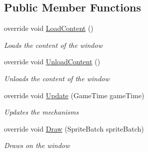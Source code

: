 \subsection*{Public Member Functions}
\begin{DoxyCompactItemize}
\item 
override void \hyperlink{class_hel_project_1_1_u_i_1_1_play_screen_af3639840bdd8de714d262377c417ee20}{Load\+Content} ()
\begin{DoxyCompactList}\small\item\em Loads the content of the window \end{DoxyCompactList}\item 
override void \hyperlink{class_hel_project_1_1_u_i_1_1_play_screen_a90c75361ad40bff449d2a560ef8f4464}{Unload\+Content} ()
\begin{DoxyCompactList}\small\item\em Unloads the content of the window \end{DoxyCompactList}\item 
override void \hyperlink{class_hel_project_1_1_u_i_1_1_play_screen_a012a79b297f9e09a0d21dbe952a653db}{Update} (Game\+Time game\+Time)
\begin{DoxyCompactList}\small\item\em Updates the mechanisms \end{DoxyCompactList}\item 
override void \hyperlink{class_hel_project_1_1_u_i_1_1_play_screen_a0f290e8d07d6632fd53a66efc585e853}{Draw} (Sprite\+Batch sprite\+Batch)
\begin{DoxyCompactList}\small\item\em Draws on the window \end{DoxyCompactList}\end{DoxyCompactItemize}

